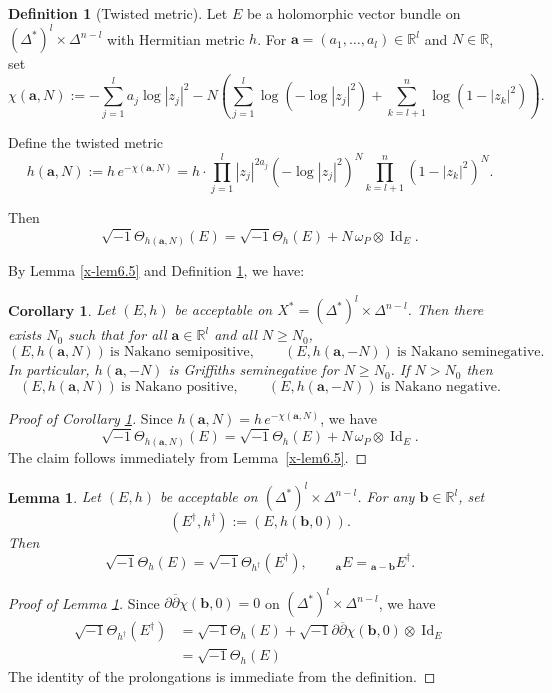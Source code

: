 \documentclass[12pt,twoside]{amsart}
\DeclareMathOperator{\Id}{Id}
\newtheorem{lem}[thm]{Lemma}
\newtheorem{cor}[thm]{Corollary}
\theoremstyle{definition}
\newtheorem{defn}[thm]{Definition}
\begin{document}
\begin{defn}[Twisted metric]\label{x-def6.6}
Let $E$ be a holomorphic vector bundle on
$(\Delta^*)^l\times \Delta^{n-l}$ with Hermitian metric $h$. 
For $\bm a=(a_1,\dots,a_l)\in\mathbb{R}^l$ and $N\in\mathbb{R}$, set 
\[
\chi(\bm a,N)
 := -\sum_{j=1}^l a_j \log|z_j|^2
    - N\!\left(
         \sum_{j=1}^l \log(-\log|z_j|^2)
       + \sum_{k=l+1}^n \log(1-|z_k|^2)
       \right).
\]

Define the twisted metric
\[
h(\bm a,N)
 := h\, e^{-\chi(\bm a,N)}
 = h \cdot 
   \prod_{j=1}^l |z_j|^{2a_j}(-\log|z_j|^2)^N
   \prod_{k=l+1}^n (1-|z_k|^2)^N.
\]

Then
\[
\sqrt{-1}\Theta_{h(\bm a,N)}(E)
 = \sqrt{-1}\Theta_h(E)
   + N\,\omega_P \otimes \Id_E.
\]
\end{defn}

By Lemma \ref{x-lem6.5} and Definition \ref{x-def6.6}, we have: 

\begin{cor}\label{x-cor6.7}
Let $(E,h)$ be acceptable on $X^*=(\Delta^*)^l\times\Delta^{n-l}$.
Then there exists $N_0$ such that for all $\bm a\in\mathbb{R}^l$ and all
$N\ge N_0$,
\[
(E,h(\bm a,N)) \ \text{is Nakano semipositive},\qquad
(E,h(\bm a,-N)) \ \text{is Nakano seminegative}.
\]
In particular, $h(\bm a,-N)$ is Griffiths seminegative for $N\ge N_0$.
If $N>N_0$ then 
\[
(E,h(\bm a,N)) \ \text{is Nakano positive},\qquad
(E,h(\bm a,-N)) \ \text{is Nakano negative}.
\]
\end{cor}

\begin{proof}[Proof of Corollary \ref{x-cor6.7}]
Since $h(\bm a,N)=h\,e^{-\chi(\bm a,N)}$, we have
\[
\sqrt{-1}\Theta_{h(\bm a,N)}(E)
 = \sqrt{-1}\Theta_h(E) + N\,\omega_P\otimes\Id_E.
\]
The claim follows immediately from Lemma~\ref{x-lem6.5}.
\end{proof}

\begin{lem}\label{x-lem6.8}
Let $(E,h)$ be acceptable on $(\Delta^*)^l\times\Delta^{n-l}$.
For any $\bm b\in\mathbb{R}^l$, set
\[
(E^\dagger,h^\dagger) := (E, h(\bm b,0)).
\]
Then
\[
\sqrt{-1}\Theta_h(E)=\sqrt{-1}\Theta_{h^\dagger}(E^\dagger),
\qquad
{}_{\bm a}E = {}_{\bm a-\bm b}E^\dagger.
\]
\end{lem}

\begin{proof}[Proof of Lemma \ref{x-lem6.8}]
Since $\partial\overline{\partial}\chi(\bm b,0)=0$ on
$(\Delta^*)^l\times\Delta^{n-l}$, 
we have 
\[
\begin{split}
\sqrt{-1} \Theta_{h^\dag} (E^\dag) &=\sqrt{-1} \Theta_h (E)+
\sqrt{-1} \partial 
\overline \partial \chi (\bm b, 0)\otimes \Id_E \\ 
&=\sqrt{-1} \Theta_h(E)
\end{split}
\] 
The identity of the prolongations is immediate from the definition.
\end{proof}
\end{document}
